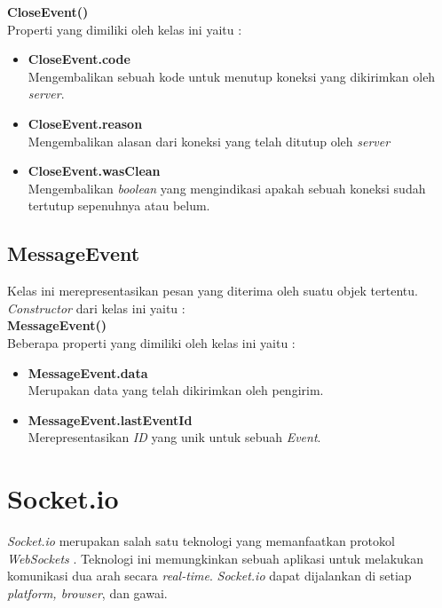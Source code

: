 \textbf{CloseEvent()} \\

Properti yang dimiliki oleh kelas ini yaitu : 

\begin{itemize}
	\item \textbf{CloseEvent.code} \\ Mengembalikan sebuah kode untuk menutup koneksi yang dikirimkan oleh \textit{server}.
	\item \textbf{CloseEvent.reason} \\ Mengembalikan alasan dari koneksi yang telah ditutup oleh \textit{server}
	\item \textbf{CloseEvent.wasClean} \\ Mengembalikan \textit{boolean} yang mengindikasi apakah sebuah koneksi sudah tertutup sepenuhnya atau belum.
\end{itemize}

\subsection{MessageEvent}
Kelas ini merepresentasikan pesan yang diterima oleh suatu objek tertentu. \textit{Constructor} dari kelas ini yaitu : \\

\textbf{MessageEvent()} \\

Beberapa properti yang dimiliki oleh kelas ini yaitu : 

\begin{itemize}
	\item \textbf{MessageEvent.data} \\ Merupakan data yang telah dikirimkan oleh pengirim.
	\item \textbf{MessageEvent.lastEventId} \\ Merepresentasikan \textit{ID} yang unik untuk sebuah \textit{Event}.
\end{itemize}



\section{Socket.io}
\label{sec:Socket.io}

\textit{Socket.io} merupakan salah satu teknologi yang memanfaatkan protokol \textit{WebSockets} \cite{socketio}. Teknologi ini memungkinkan sebuah aplikasi untuk melakukan komunikasi dua arah secara \textit{real-time}. \textit{Socket.io} dapat dijalankan di setiap \textit{platform, browser}, dan gawai.

